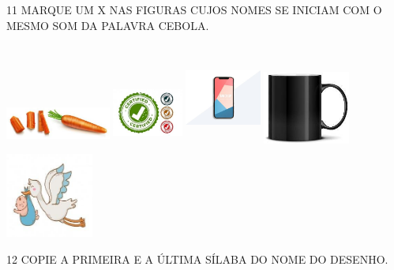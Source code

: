 
\num{11} MARQUE UM X NAS FIGURAS CUJOS NOMES SE INICIAM COM O MESMO SOM DA PALAVRA CEBOLA.


\includegraphics[width=1.36272in,height=0.72875in]{media/image105.jpg}
\includegraphics[width=0.90977in,height=1.00720in]{media/image106.jpg}
\includegraphics[width=0.98256in,height=1.40209in]{media/image107.jpg}
\includegraphics[width=1.12500in,height=1.12500in]{media/image108.jpg}
\includegraphics[width=1.13713in,height=1.09392in]{media/image109.jpg}

\num{12} COPIE A PRIMEIRA E A ÚLTIMA SÍLABA DO NOME DO DESENHO.\bigskip

